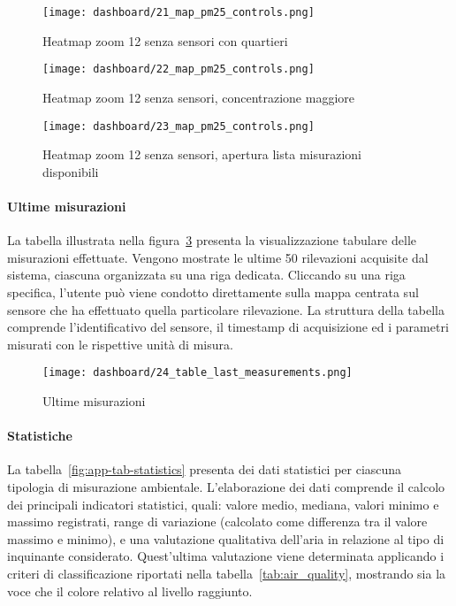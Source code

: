 \begin{figure}[H]
  \centering
  \texttt{[image: dashboard/21\_map\_pm25\_controls.png]}
  \caption{Heatmap zoom 12 senza sensori con quartieri}
  \label{fig:app-map-pm25-controls-21}

  \hfill

  \texttt{[image: dashboard/22\_map\_pm25\_controls.png]}
  \caption{Heatmap zoom 12 senza sensori, concentrazione maggiore}
  \label{fig:app-map-pm25-controls-22}
\end{figure}

\begin{figure}[H]
  \centering
  \texttt{[image: dashboard/23\_map\_pm25\_controls.png]}
  \caption{Heatmap zoom 12 senza sensori, apertura lista misurazioni disponibili}
  \label{fig:app-map-pm25-controls-23}
\end{figure}

\newpage

\paragraph{Ultime misurazioni}

La tabella illustrata nella figura~\ref{fig:app-tab-last-measurements} presenta la visualizzazione tabulare
delle misurazioni effettuate. Vengono mostrate le ultime 50 rilevazioni acquisite dal sistema, ciascuna organizzata
su una riga dedicata. Cliccando su una riga specifica, l'utente può viene condotto direttamente sulla mappa
centrata sul sensore che ha effettuato quella particolare rilevazione. La struttura della tabella comprende
l'identificativo del sensore, il timestamp di acquisizione ed i parametri misurati con le rispettive unità di misura.

\begin{figure}[H]
  \centering
  \texttt{[image: dashboard/24\_table\_last\_measurements.png]}
  \caption{Ultime misurazioni}
  \label{fig:app-tab-last-measurements}
\end{figure}

\newpage

\paragraph{Statistiche}

La tabella~\ref{fig:app-tab-statistics} presenta dei dati statistici per ciascuna tipologia di misurazione ambientale.
L'elaborazione dei dati comprende il calcolo dei principali indicatori statistici, quali: valore medio, mediana,
valori minimo e massimo registrati, range di variazione (calcolato come differenza tra il valore
massimo e minimo), e una valutazione qualitativa dell'aria in relazione al tipo di inquinante considerato.
Quest'ultima valutazione viene determinata applicando i criteri di classificazione
riportati nella tabella~\ref{tab:air_quality}, mostrando sia la voce che il colore relativo al livello raggiunto.

